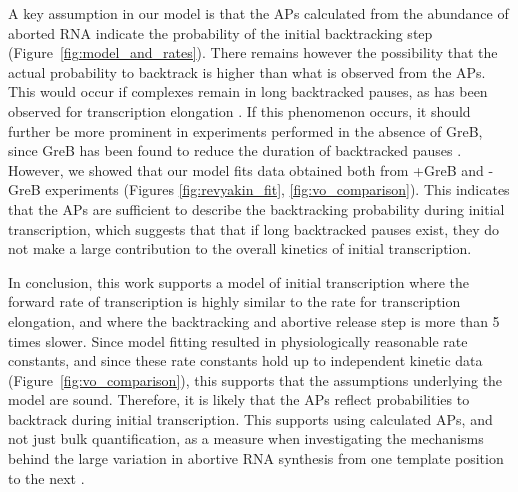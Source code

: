 A key assumption in our model is that the APs calculated from the abundance of
aborted RNA indicate the probability of the initial backtracking step
(Figure~\ref{fig:model_and_rates}). There remains however the possibility that
the actual probability to backtrack is higher than what is observed from the
APs. This would occur if complexes remain in long backtracked pauses, as has
been observed for transcription elongation \cite{shaevitz_backtracking_2003}.
If this phenomenon occurs, it should further be more prominent in experiments
performed in the absence of GreB, since GreB has been found to reduce the
duration of backtracked pauses \cite{shaevitz_backtracking_2003}. However, we
showed that our model fits data obtained both from +GreB and -GreB experiments
(Figures \ref{fig:revyakin_fit}, \ref{fig:vo_comparison}). This indicates that
the APs are sufficient to describe the backtracking probability during initial
transcription, which suggests that that if long backtracked pauses exist, they
do not make a large contribution to the overall kinetics of initial
transcription.

In conclusion, this work supports a model of initial transcription where the
forward rate of transcription is highly similar to the rate for transcription
elongation, and where the backtracking and abortive release step is more than
5 times slower. Since model fitting resulted in physiologically reasonable
rate constants, and since these rate constants hold up to independent kinetic
data (Figure~\ref{fig:vo_comparison}), this supports that the assumptions
underlying the model are sound. Therefore, it is likely that the APs reflect
probabilities to backtrack during initial transcription. This supports using
calculated APs, and not just bulk quantification, as a measure when
investigating the mechanisms behind the large variation in abortive RNA
synthesis from one template position to the next \cite{hsu_initial_2006}.
